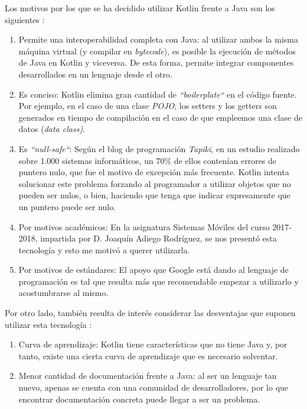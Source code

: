 \documentclass[twoside]{report}
\begin{document}
Los motivos por los que se ha decidido utilizar Kotlin frente a Java son los siguientes \cite{kotlin}:
\begin{enumerate}

\item Permite una interoperabilidad completa con Java: al utilizar ambos la misma máquina virtual (y compilar en \textit{bytecode}), es posible la ejecución de métodos de Java en Kotlin y viceversa. De esta forma, permite integrar componentes desarrollados en un lenguaje desde el otro.

\item Es conciso: Kotlin elimina gran cantidad de \textit{“boilerplate“} en el código fuente. Por ejemplo, en el caso de una clase \textit{POJO}, los setters y los getters son generados en tiempo de compilación en el caso de que empleemos una clase de datos (\textit{data class)}.

\item Es \textit{“null-safe“}: Según el blog de programación \cite{tapikinull} \textit{Tapiki}, en un estudio realizado sobre 1.000 sistemas informáticos, un 70\% de ellos contenían errores de puntero nulo, que fue el motivo de excepción más frecuente. Kotlin intenta solucionar este problema forzando al programador a utilizar objetos que no pueden ser nulos, o bien, haciendo que tenga que indicar expresamente que un puntero puede ser nulo.

\item Por motivos académicos: En la asignatura \cite{smovkotlin} Sistemas Móviles del curso 2017-2018, impartida por D. Joaquín Adiego Rodríguez, se nos presentó esta tecnología y esto me motivó a querer utilizarla.

\item Por motivos de estándares: El apoyo que Google está dando al lenguaje de programación es tal que resulta más que recomendable empezar a utilizarlo y acostumbrarse al mismo.
\end{enumerate}

Por otro lado, también resulta de interés considerar las desventajas que suponen utilizar esta tecnología \cite{disadvKotlin}:
\begin{enumerate}

\item Curva de aprendizaje: Kotlin tiene características que no tiene Java y, por tanto, existe una cierta curva de aprendizaje que es necesario solventar.

\item Menor cantidad de documentación frente a Java: al ser un lenguaje tan nuevo, apenas se cuenta con una comunidad de desarrolladores, por lo que encontrar documentación concreta puede llegar a ser un problema.
\end{enumerate}
\end{document}
